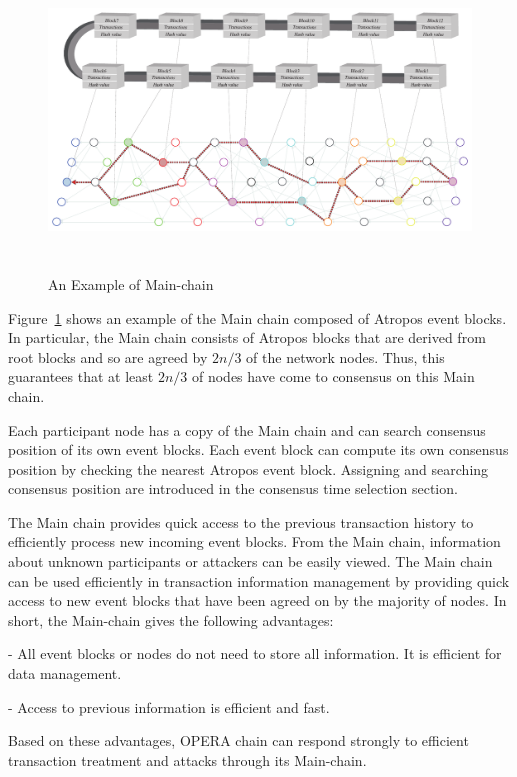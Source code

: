 \documentclass{article}
\begin{document}
\begin{figure} [H] \centering  
\includegraphics[height=8cm, width=1.0\columnwidth]{Mainchain.pdf}
\caption{An Example of Main-chain}
\label{fig:mainchain}
\end{figure}

Figure~\ref{fig:mainchain} shows an example of the Main chain composed of Atropos event blocks. 
In particular, the Main chain consists of Atropos blocks that are derived from root blocks and so are agreed by $2n/3$ of the network nodes. Thus, this guarantees that at least $2n/3$ of nodes have come to consensus on this Main chain. 

Each participant node has a copy of the Main chain and can search consensus position of its own event blocks.
Each event block can compute its own consensus position by checking the nearest Atropos event block. Assigning and searching consensus position are introduced in the consensus time selection section. 

The Main chain provides quick access to the previous transaction history to efficiently process new incoming event blocks. From the Main chain, information about unknown participants or attackers can be easily viewed.
The Main chain can be used efficiently in transaction information management by providing quick access to new event blocks that have been agreed on by the majority of nodes. In short, the Main-chain gives the following advantages:

-	All event blocks or nodes do not need to store all information. It is efficient for data management.

-	Access to previous information is efficient and fast.

Based on these advantages, OPERA chain can respond strongly to efficient transaction treatment and attacks through its Main-chain.
\end{document}
